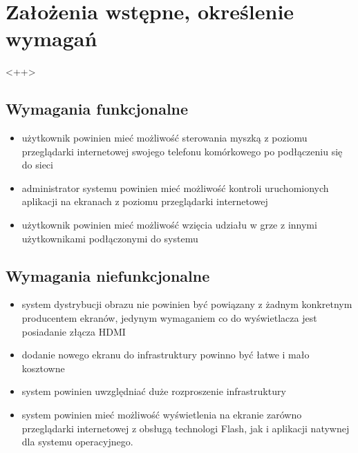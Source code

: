\section{Założenia wstępne, określenie wymagań}
\label{sec:requirement}<++>

\subsection{Wymagania funkcjonalne}

\begin{itemize}
	\item użytkownik powinien mieć możliwość sterowania myszką z poziomu przeglądarki internetowej swojego telefonu komórkowego po podłączeniu się do sieci
	\item administrator systemu powinien mieć możliwość kontroli uruchomionych aplikacji na ekranach z poziomu przeglądarki internetowej
	\item użytkownik powinien mieć możliwość wzięcia udziału w grze z innymi użytkownikami podłączonymi do systemu
\end{itemize}


\subsection{Wymagania niefunkcjonalne}
\begin{itemize}
	\item system dystrybucji obrazu nie powinien być powiązany z żadnym konkretnym producentem ekranów, jedynym wymaganiem co do wyświetlacza jest posiadanie złącza HDMI
	\item dodanie nowego ekranu do infrastruktury powinno być łatwe i mało kosztowne
	\item system powinien uwzględniać duże rozproszenie infrastruktury 
	\item system powinien mieć możliwość wyświetlenia na ekranie zarówno przeglądarki internetowej z obsługą technologi Flash, jak i aplikacji natywnej dla systemu operacyjnego.
\end{itemize}
